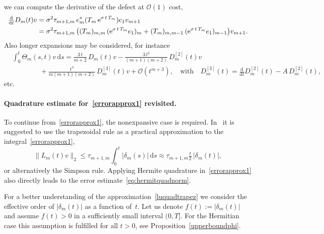 \documentclass[smallextended]{svjour3pre}%
\numberwithin{equation}{section}
\numberwithin{figure}{section}
\numberwithin{table}{section}
\newcommand\tjnew[1]{{#1}}
\newcommand{\dd}{\mathrm{d}}
\newcommand{\ee}{{\rm e}}
\newcommand\sca{\sigma}
\begin{document}
{we can compute the derivative of the defect at $\mathcal{O}(1)$ cost,
\begin{align*}
\tfrac{\dd}{\dd t} D_m(t)v
&= \sca^2 \tau_{m+1,m}\,e_m^\ast(T_m\,\ee^{\sca\,t\,T_m})e_1 v_{m+1} \\
&= \sca^2 \tau_{m+1,m}\,\big((T_m)_{m,m}\, (\ee^{\sca\,t\,T_m} e_1)_m + (T_m)_{m,m-1}\, (\ee^{\sca\,t\,T_m} e_1)_{m-1}\big)v_{m+1}.
\end{align*}
Also longer expansions may be considered, for instance
\begin{align*}
&\int_0^t \Theta_m(s,t)v\,\dd s =
\frac{3\,t}{m+2}\,D_m(t)v
- \frac{3\,t^2}{(m+1)(m+2)}\,D_m^{[2]}(t)v \\
& \qquad\qquad {} + \frac{t^3}{m(m+1)(m+2)}\,D_m^{[3]}(t)v
+ {\mathcal{O}}(t^{m+3}),
\quad \text{with} \quad
D_m^{[3]}(t) = \tfrac{\dd}{\dd t} D_m^{[2]}(t) - A\,D_m^{[2]}(t),
\end{align*}
etc.
}

\paragraph{Quadrature estimate for~\eqref{errorapprox1} revisited.}
\tjnew{To continue from~\eqref{errorapprox1}, the nonexpansive case is required.}
In~\cite{lubich08} it is suggested to use the trapezoidal rule as a practical approximation
to the integral~\eqref{errorapprox1},
\begin{equation}\label{luquadtrapez}
\|L_m(t)v\|_2 \leq \tau_{m+1,m} \int_0^t |\delta_m(s)| \, \dd s \approx \tau_{m+1,m} \tfrac{t}{2} \,|\delta_m(t)|,
\end{equation}
or alternatively the Simpson rule.
Applying Hermite quadrature in~\eqref{errorapprox1} also directly leads to the error estimate~\eqref{eq:hermitquadnorm}.

For a better understanding of the approximation~\eqref{luquadtrapez} we consider the effective order of $|\delta_m(t)|$
as a function of~$ t $. Let us denote $f(t):=|\delta_m(t)|$ and assume $f(t)>0$ in a sufficiently small interval $(0,T]$.
For the Hermitian case this assumption is fulfilled for all $t>0$, see Proposition~\ref{upperboundphi}.
\end{document}
